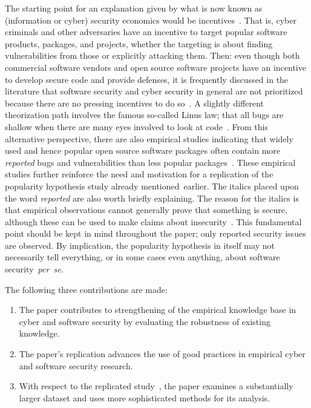 \documentclass[5p, twocolumn, numbers, sort]{elsarticle}
\begin{document}
The starting point for an explanation given by what is now known as (information
or cyber) security economics would be incentives~\cite{Anderson08}. That is,
cyber criminals and other adversaries have an incentive to target popular
software products, packages, and projects, whether the targeting is about
finding vulnerabilities from those or explicitly attacking them. Then: even
though both commercial software vendors and open source software projects have
an incentive to develop secure code and provide defenses, it is frequently
discussed in the literature that software security and cyber security in general
are not prioritized because there are no pressing incentives to do
so~\cite{Ruohonen24JSS}. A slightly different theorization path involves the
famous so-called Linus law; that all bugs are shallow when there are many eyes
involved to look at code~\cite{Raymond01}. From this alternative perspective,
there are also empirical studies indicating that widely used and hence popular
open source software packages often contain more \textit{reported} bugs and
vulnerabilities than less popular packages~\cite{Davies10, Herraiz11,
  Ruohonen19EASE}. These empirical studies further reinforce the need and
motivation for a replication of the popularity hypothesis study already
mentioned~earlier. The italics placed upon the word \textit{reported} are also
worth briefly explaining. The reason for the italics is that empirical
observations cannot generally prove that something is secure, although these can
be used to make claims about insecurity~\cite{Herley17}. This fundamental point
should be kept in mind throughout the paper; only reported security issues are
observed. By implication, the popularity hypothesis in itself may not
necessarily tell everything, or in some cases even anything, about software
security~\textit{per~se}.

The following three contributions are made:
%
\begin{enumerate}
%
\itemsep 5pt
%
\item{The paper contributes to strengthening of the empirical knowledge base in
  cyber and software security by evaluating the robustness of existing knowledge.}
%
\item{The paper's replication advances the use of good practices in empirical
  cyber and software security research.}
%
\item{With respect to the replicated study~\cite{Siavvas18}, the paper examines
  a substantially larger dataset and uses more sophisticated methods for its
  analysis.}
%
\end{enumerate}
\end{document}
